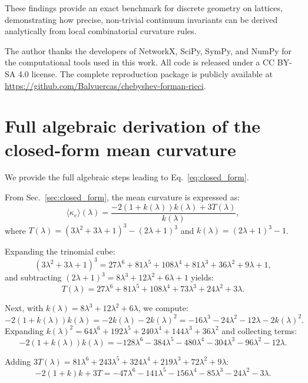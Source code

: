 \documentclass[aps,pre,onecolumn,10pt,groupedaddress,amsmath,amssymb,floatfix]{revtex4-2}
\begin{document}
These findings provide an exact benchmark for discrete geometry on lattices, demonstrating how precise, non-trivial continuum invariants can be derived analytically from local combinatorial curvature rules.

\begin{acknowledgments}
	The author thanks the developers of NetworkX, SciPy, SymPy, and NumPy for the computational tools used in this work. All code is released under a CC BY-SA 4.0 license. The complete reproduction package is publicly available at \url{https://github.com/Balvuercas/chebyshev-forman-ricci}.
\end{acknowledgments}

\appendix

\section{Full algebraic derivation of the closed-form mean curvature}
\label{app:algebra}

We provide the full algebraic steps leading to Eq.~\eqref{eq:closed_form}.

From Sec.~\ref{sec:closed_form}, the mean curvature is expressed as:
\[
\langle\kappa_e\rangle(\lambda) = \frac{-2(1+k(\lambda))k(\lambda) + 3T(\lambda)}{k(\lambda)},
\]
where $T(\lambda) = (3\lambda^2+3\lambda+1)^3 - (2\lambda+1)^3$ and $k(\lambda) = (2\lambda+1)^3 - 1$.

Expanding the trinomial cube:
\[
(3\lambda^2+3\lambda+1)^3 = 27\lambda^6 + 81\lambda^5 + 108\lambda^4 + 81\lambda^3 + 36\lambda^2 + 9\lambda + 1,
\]
and subtracting $(2\lambda+1)^3 = 8\lambda^3 + 12\lambda^2 + 6\lambda + 1$ yields:
\[
T(\lambda) = 27\lambda^6 + 81\lambda^5 + 108\lambda^4 + 73\lambda^3 + 24\lambda^2 + 3\lambda.
\]

Next, with $k(\lambda) = 8\lambda^3+12\lambda^2+6\lambda$, we compute:
\[
-2(1+k(\lambda))k(\lambda) = -2k(\lambda) - 2k(\lambda)^2 = -16\lambda^3 - 24\lambda^2 - 12\lambda - 2k(\lambda)^2.
\]
Expanding $k(\lambda)^2 = 64\lambda^6+192\lambda^5+240\lambda^4+144\lambda^3+36\lambda^2$ and collecting terms:
\[
-2(1+k(\lambda))k(\lambda) = -128\lambda^6 - 384\lambda^5 - 480\lambda^4 - 304\lambda^3 - 96\lambda^2 - 12\lambda.
\]

Adding $3T(\lambda) = 81\lambda^6 + 243\lambda^5 + 324\lambda^4 + 219\lambda^3 + 72\lambda^2 + 9\lambda$:
\[
-2(1+k)k + 3T = -47\lambda^6 - 141\lambda^5 - 156\lambda^4 - 85\lambda^3 - 24\lambda^2 - 3\lambda.
\]
\end{document}
